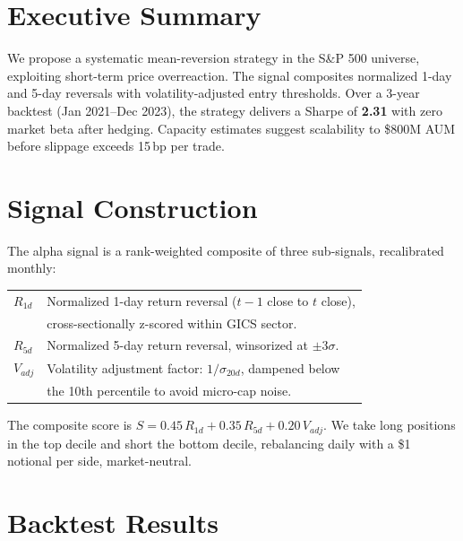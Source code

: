\documentclass[10pt]{article}
\begin{document}
\begin{minipage}[t]{0.615\linewidth}

\section{Executive Summary}

We propose a systematic mean-reversion strategy in the S\&P 500 universe,
exploiting short-term price overreaction. The signal composites normalized
1-day and 5-day reversals with volatility-adjusted entry thresholds. Over a
3-year backtest (Jan 2021--Dec 2023), the strategy delivers a Sharpe of
\textbf{2.31} with zero market beta after hedging. Capacity estimates
suggest scalability to \$800M AUM before slippage exceeds 15\,bp per trade.

\section{Signal Construction}

The alpha signal is a rank-weighted composite of three sub-signals,
recalibrated monthly:

\vspace{2pt}
{\footnotesize
\begin{tabularx}{\linewidth}{@{}>{\color{navy}\bfseries}l@{\hspace{5mm}}>{\raggedright\arraybackslash}X@{}}
$R_{1d}$   & Normalized 1-day return reversal ($t-1$ close to $t$ close),\\
           & cross-sectionally z-scored within GICS sector.\\
$R_{5d}$   & Normalized 5-day return reversal, winsorized at $\pm 3\sigma$.\\
$V_{adj}$  & Volatility adjustment factor: $1/\sigma_{20d}$, dampened below\\
           & the 10th percentile to avoid micro-cap noise.\\
\end{tabularx}
}

\vspace{4pt}
The composite score is $S = 0.45\,R_{1d} + 0.35\,R_{5d} + 0.20\,V_{adj}$.
We take long positions in the top decile and short the bottom decile,
rebalancing daily with a \$1 notional per side, market-neutral.

\section{Backtest Results}


\end{minipage}
\end{document}
